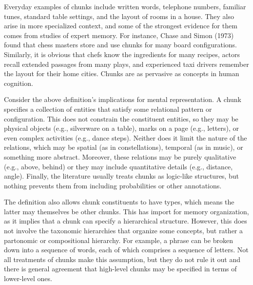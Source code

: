\documentclass[11pt,letterpaper]{article}
\begin{document}
Everyday examples of chunks include written words, telephone numbers, 
familiar tunes, standard table settings, and the layout of rooms in 
a house. They also arise in more specialized context, and some of the
strongest evidence for them comes from studies of expert memory. For 
instance, Chase and Simon (1973) found that chess masters store and use
chunks for many board configurations. Similarly, it is obvious that chefs
know the ingredients for many recipes, actors recall extended passages
from many plays, and experienced taxi drivers remember the layout for 
their home cities. Chunks are as pervasive as concepts in human cognition. 


Consider the above definition's implications for mental representation. 
A chunk specifies a collection of entities that satisfy some relational
  pattern or configuration.
This does not constrain the constituent entities, so they may be physical 
  objects (e.g., silverware on a table), marks on a page (e.g., letters), 
  or even complex activities (e.g., dance steps). 
Neither does it limit the nature of the relations, which may be spatial
  (as in constellations), temporal (as in music), or something more 
  abstract. 
Moreover, these relations may be purely qualitative (e.g., above, behind) 
  or they may include quantitative details (e.g., distance, angle). 
Finally, the literature usually treats chunks as logic-like structures, 
  but nothing prevents them from including probabilities or other 
  annotations. 


The definition also allows chunk constituents to have types, which means 
  the latter may themselves be other chunks. 
This has import for memory organization, as it implies that a chunk can 
  specify a hierarchical structure. 
However, this does not involve the taxonomic hierarchies that organize 
  some concepts, but rather a partonomic or compositional hierarchy.
For example, a phrase can be broken down into a sequence of words, each 
  of which comprises a sequence of letters. 
Not all treatments of chunks make this assumption, but they do not rule 
  it out and there is general agreement that high-level chunks may be
  specified in terms of lower-level ones. 


\end{document}
